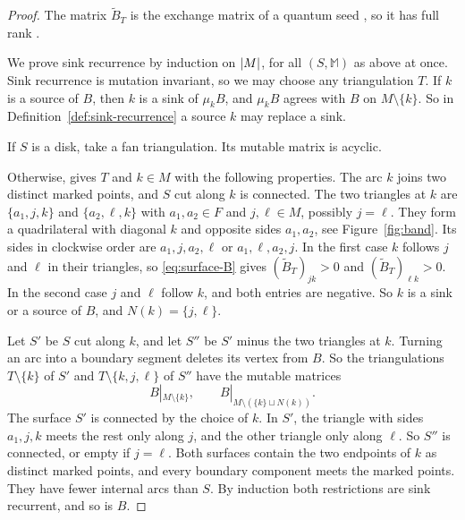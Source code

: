\documentclass[12pt, letter]{amsart}
\theoremstyle{definition}
\begin{document}
\begin{proof}
The matrix $\widetilde B_T$ is the exchange matrix of a quantum seed \cite[Proposition~7.8]{Muller-skein}, so it has full rank \cite[Proposition~7.2]{Muller-skein}.

We prove sink recurrence by induction on $\lvert M\rvert$, for all $(S,\mathbb M)$ as above at once.
Sink recurrence is mutation invariant, so we may choose any triangulation $T$.
If $k$ is a source of $B$, then $k$ is a sink of $\mu_kB$, and $\mu_kB$ agrees with $B$ on $M\setminus\{k\}$.
So in Definition~\ref{def:sink-recurrence} a source $k$ may replace a sink.

If $S$ is a disk, take a fan triangulation.
Its mutable matrix is acyclic.


Otherwise, \cite[Lemma~4.16, case (2a) of the proof]{Ladkani} gives $T$ and $k\in M$ with the following properties.
The arc $k$ joins two distinct marked points, and $S$ cut along $k$ is connected.
The two triangles at $k$ are $\{a_1,j,k\}$ and $\{a_2,\ell,k\}$ with $a_1,a_2\in F$ and $j,\ell\in M$, possibly $j=\ell$.
They form a quadrilateral with diagonal $k$ and opposite sides $a_1,a_2$, see Figure~\ref{fig:band}.
Its sides in clockwise order are $a_1,j,a_2,\ell$ or $a_1,\ell,a_2,j$.
In the first case $k$ follows $j$ and $\ell$ in their triangles, so \eqref{eq:surface-B} gives $(\widetilde B_T)_{jk}>0$ and $(\widetilde B_T)_{\ell k}>0$.
In the second case $j$ and $\ell$ follow $k$, and both entries are negative.
So $k$ is a sink or a source of $B$, and $N(k)=\{j,\ell\}$.

Let $S'$ be $S$ cut along $k$, and let $S''$ be $S'$ minus the two triangles at $k$.
Turning an arc into a boundary segment deletes its vertex from $B$.
So the triangulations $T\setminus\{k\}$ of $S'$ and $T\setminus\{k,j,\ell\}$ of $S''$ have the mutable matrices
\[
 B|_{M\setminus\{k\}},\qquad B|_{M\setminus(\{k\}\sqcup N(k))} .
\]
The surface $S'$ is connected by the choice of $k$.
In $S'$, the triangle with sides $a_1,j,k$ meets the rest only along $j$, and the other triangle only along $\ell$.
So $S''$ is connected, or empty if $j=\ell$.
Both surfaces contain the two endpoints of $k$ as distinct marked points, and every boundary component meets the marked points.
They have fewer internal arcs than $S$.
By induction both restrictions are sink recurrent, and so is $B$.
\end{proof}





\end{document}
